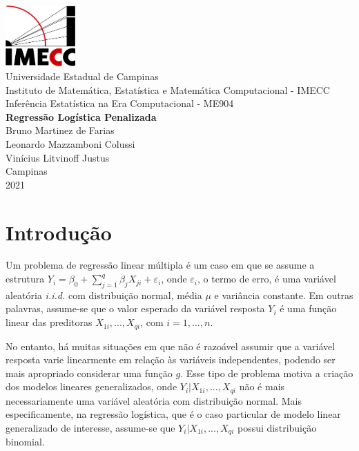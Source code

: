 \documentclass[
  12pt,
]{article}
\author{}
\date{\vspace{-2.5em}}
\begin{document}
\begin{titlepage} 
\begin{center} 

\vfill
\includegraphics[width=0.2\textwidth]{logo-imecc (1) (1).png}\\ [0.1in]

{\large Universidade Estadual de Campinas}\\ [0.2cm] 
{\large Instituto de Matemática, Estatística e Matemática Computacional - IMECC}\\ [0.2cm] 
{\large Inferência Estatística na Era Computacional - ME904}\\ [6cm]


{\bf \Large Regressão Logística Penalizada}\\ [8cm]

{\large Bruno Martinez de Farias} \\ [0.2cm]
{\large Leonardo Mazzamboni Colussi} \\ [0.2cm]
{\large Vinícius Litvinoff Justus} \\ [2cm]  
 


{\large Campinas}\\ [0.2cm]
{\large 2021}

\end{center}
\end{titlepage}

\newpage
{}
\tableofcontents
\cleardoublepage

\section{Introdução}

\quad Um problema de regressão linear múltipla é um caso em que se
assume a estrutura
\(Y_i = \beta_0 + \sum_{j=1}^q \beta_j X_{ji} + \varepsilon_i\), onde
\(\varepsilon_i\), o termo de erro, é uma variável aleatória
\emph{i.i.d.} com distribuição normal, média \(\mu\) e variância
constante. Em outras palavras, assume-se que o valor esperado da
variável resposta \(Y_i\) é uma função linear das preditoras
\(X_{1i}, ..., X_{qi}\), com \(i = 1, ..., n\).

\quad No entanto, há muitas situações em que não é razoável assumir que
a variável resposta varie linearmente em relação às variáveis
independentes, podendo ser mais apropriado considerar uma função \(g\).
Esse tipo de problema motiva a criação dos modelos lineares
generalizados, onde \(Y_i|X_{1i}, ..., X_{qi}\) não é mais
necessariamente uma variável aleatória com distribuição normal. Mais
especificamente, na regressão logística, que é o caso particular de
modelo linear generalizado de interesse, assume-se que
\(Y_i|X_{1i}, ..., X_{qi}\) possui distribuição binomial.
\end{document}
